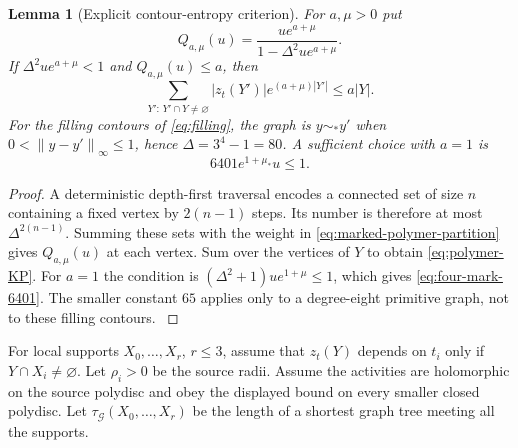 \documentclass[11pt,oneside,openany]{book}
\newtheorem{lemma}[lemma]{Lemma}
\theoremstyle{definition}
\theoremstyle{remark}
\newcommand{\norm}[1]{\left\lVert#1\right\rVert}
\newcommand{\src}[2]{\cite[#2]{#1}}
\begin{document}
\begin{lemma}[Explicit contour-entropy criterion]
\label{lem:polymer-entropy-gate}
For $a,\mu>0$ put
\begin{equation}\label{eq:polymer-Q}
Q_{a,\mu}(u)=\frac{u e^{a+\mu}}
                 {1-\Delta^2u e^{a+\mu}}.
\end{equation}
If $\Delta^2u e^{a+\mu}<1$ and $Q_{a,\mu}(u)\le a$, then
\begin{equation}\label{eq:polymer-KP}
\sum_{Y':\,Y'\cap Y\ne\varnothing}
 |z_t(Y')|e^{(a+\mu)|Y'|}\le a|Y|.
\end{equation}
For the filling contours of \cref{eq:filling}, the graph is
$y\sim_* y'$ when $0<\norm{y-y'}_\infty\le1$, hence
$\Delta=3^4-1=80$. A sufficient choice with $a=1$ is
\begin{equation}\label{eq:four-mark-6401}
6401e^{1+\mu_*}u\le1.
\end{equation}
\end{lemma}
\begin{proof}
A deterministic depth-first traversal encodes a connected set of size
$n$ containing a fixed vertex by $2(n-1)$ steps. Its number is therefore
at most $\Delta^{2(n-1)}$. Summing these sets with the weight in
\cref{eq:marked-polymer-partition} gives $Q_{a,\mu}(u)$ at each vertex.
Sum over the vertices of $Y$ to obtain \cref{eq:polymer-KP}. For $a=1$
the condition is $(\Delta^2+1)u e^{1+\mu}\le1$, which gives
\cref{eq:four-mark-6401}. The smaller constant $65$ applies only to a
degree-eight primitive graph, not to these filling contours.
\src{F8}{V61, V63}
\end{proof}

For local supports $X_0,\ldots,X_r$, $r\le3$, assume that $z_t(Y)$
depends on $t_i$ only if $Y\cap X_i\ne\varnothing$. Let $\rho_i>0$ be
the source radii. Assume the activities are holomorphic on the source
polydisc and obey the displayed bound on every smaller closed
polydisc. Let $\tau_\mathcal G(X_0,\ldots,X_r)$ be the length
of a shortest graph tree meeting all the supports.
\end{document}
